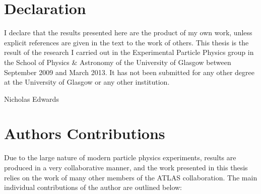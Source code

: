 \chapter*{Declaration}
I declare that the results presented here are the product of my own work, unless
explicit references are given in the text to the work of others. This thesis is
the result of the research I carried out in the Experimental Particle Physics
group in the School of Physics \& Astronomy of the University of Glasgow between
September 2009 and March 2013. It has not been submitted for any other degree
at the University of Glasgow or any other institution.

\hfill Nicholas Edwards

\chapter*{Authors Contributions}

Due to the large nature of modern particle physics experiments, results are produced in a very collaborative
manner, and the work presented in this thesis relies on the work of many other
members of the ATLAS collaboration.
The main individual contributions of the author are outlined below:

